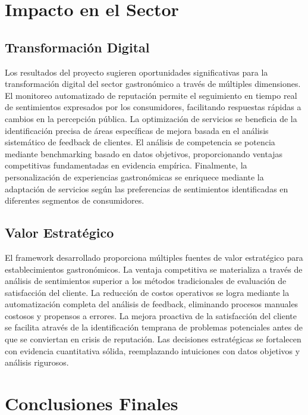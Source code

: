 \documentclass[12pt,a4paper,twoside,openany]{book}
\begin{document}
\section{Impacto en el Sector}

\subsection{Transformación Digital}

Los resultados del proyecto sugieren oportunidades significativas para la transformación digital del sector gastronómico a través de múltiples dimensiones. El monitoreo automatizado de reputación permite el seguimiento en tiempo real de sentimientos expresados por los consumidores, facilitando respuestas rápidas a cambios en la percepción pública. La optimización de servicios se beneficia de la identificación precisa de áreas específicas de mejora basada en el análisis sistemático de feedback de clientes. El análisis de competencia se potencia mediante benchmarking basado en datos objetivos, proporcionando ventajas competitivas fundamentadas en evidencia empírica. Finalmente, la personalización de experiencias gastronómicas se enriquece mediante la adaptación de servicios según las preferencias de sentimientos identificadas en diferentes segmentos de consumidores.

\subsection{Valor Estratégico}

El framework desarrollado proporciona múltiples fuentes de valor estratégico para establecimientos gastronómicos. La ventaja competitiva se materializa a través de análisis de sentimientos superior a los métodos tradicionales de evaluación de satisfacción del cliente. La reducción de costos operativos se logra mediante la automatización completa del análisis de feedback, eliminando procesos manuales costosos y propensos a errores. La mejora proactiva de la satisfacción del cliente se facilita através de la identificación temprana de problemas potenciales antes de que se conviertan en crisis de reputación. Las decisiones estratégicas se fortalecen con evidencia cuantitativa sólida, reemplazando intuiciones con datos objetivos y análisis rigurosos.

\section{Conclusiones Finales}
\end{document}
